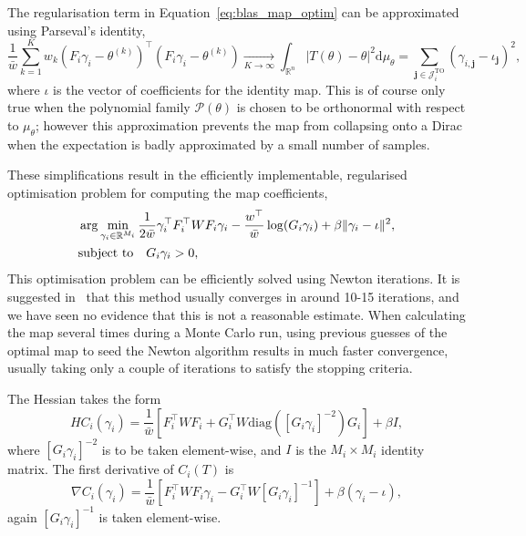 \documentclass[final]{siamltex}
\begin{document}
The regularisation term in Equation~\eqref{eq:blas_map_optim} can be approximated using Parseval's identity,
\[
	\frac{1}{\bar{w}}\sum\limits_{k=1}^K \! w_k
        (F_i\gamma_i-\theta^{(k)})^\top(F_i\gamma_i-\theta^{(k)})
        \xrightarrow[K \to \infty]{}
		\int_{\mathbb{R}^n} |T(\theta)-\theta|^2 \text{d}\mu_\theta =
		\sum\limits_{\mathbf{j}\in\mathcal{J}_i^\text{TO}} (\gamma_{i,\mathbf{j}}-\iota_\mathbf{j})^2,
\]
where $\iota$ is the vector of coefficients for the identity map. This is of course only true when
the polynomial family $\mathcal{P}(\theta)$ is chosen to be orthonormal with respect to $\mu_\theta$; however this
approximation prevents the map from collapsing onto a Dirac when the expectation is badly approximated by a small number of samples.%

These simplifications result in the efficiently implementable, regularised optimisation problem for
computing the map coefficients, 
\begin{align}\label{eq:weighted_map_optim}
	&\arg\min_{\gamma_i\in\mathbb{R}^{M_i}} \frac{1}{2\bar{w}}\gamma_i^\top F_i^\top WF_i\gamma_i -
		\frac{w^\top}{\bar{w}}\log(G_i\gamma_i) + \beta\|\gamma_i-\iota\|^2, \\
	&\text{subject to} \quad G_i\gamma_i > 0, \notag
\end{align}
This optimisation problem can be efficiently solved using Newton iterations. It is suggested
in~\cite{parno2014transport} that this method usually converges in around 10-15 iterations, and we
have seen no evidence that this is not a reasonable estimate. When calculating the map several times
during a Monte Carlo run, using previous guesses of the optimal map to seed the Newton algorithm
results in much faster convergence, usually taking only a couple of iterations to satisfy the stopping
criteria.

The Hessian takes the
form
\begin{equation}\label{eqn:TPAIS_hessian}
	HC_i(\gamma_i) = \frac{1}{\bar{w}}\left[F_i^\top WF_i + G_i^\top
		W\text{diag}([G_i\gamma_i]^{-2})G_i\right] + \beta I,
\end{equation}
where $[G_i\gamma_i]^{-2}$ is to be taken element-wise, and $I$ is the $M_i\times M_i$
identity matrix. The first derivative of $C_i(T)$ is
\[
	\nabla C_i(\gamma_i) = \frac{1}{\bar{w}}\left[F_i^\top WF_i\gamma_i - G_i^\top
		W[G_i\gamma_i]^{-1}\right] + \beta(\gamma_i - \iota),
\]
again $[G_i\gamma_i]^{-1}$ is taken element-wise.
\end{document}
